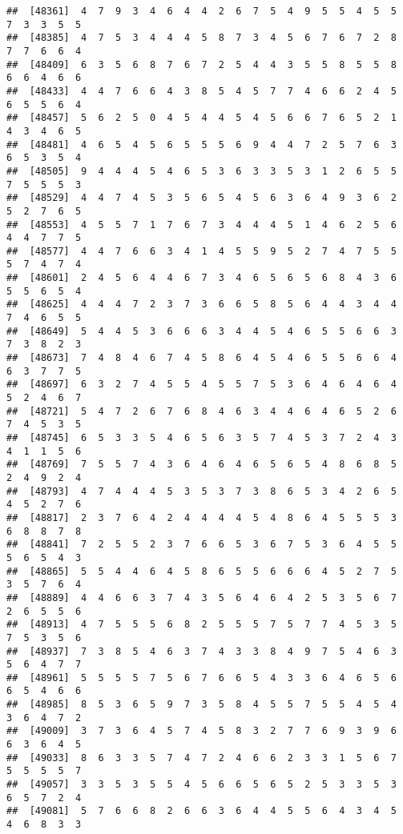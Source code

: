 \documentclass[
]{book}
\begin{document}
\begin{verbatim}
##  [48361]  4  7  9  3  4  6  4  4  2  6  7  5  4  9  5  5  4  5  5  7  3  3  5  5
##  [48385]  4  7  5  3  4  4  4  5  8  7  3  4  5  6  7  6  7  2  8  7  7  6  6  4
##  [48409]  6  3  5  6  8  7  6  7  2  5  4  4  3  5  5  8  5  5  8  6  6  4  6  6
##  [48433]  4  4  7  6  6  4  3  8  5  4  5  7  7  4  6  6  2  4  5  6  5  5  6  4
##  [48457]  5  6  2  5  0  4  5  4  4  5  4  5  6  6  7  6  5  2  1  4  3  4  6  5
##  [48481]  4  6  5  4  5  6  5  5  5  6  9  4  4  7  2  5  7  6  3  6  5  3  5  4
##  [48505]  9  4  4  4  5  4  6  5  3  6  3  3  5  3  1  2  6  5  5  7  5  5  5  3
##  [48529]  4  4  7  4  5  3  5  6  5  4  5  6  3  6  4  9  3  6  2  5  2  7  6  5
##  [48553]  4  5  5  7  1  7  6  7  3  4  4  4  5  1  4  6  2  5  6  4  4  7  7  5
##  [48577]  4  4  7  6  6  3  4  1  4  5  5  9  5  2  7  4  7  5  5  5  7  4  7  4
##  [48601]  2  4  5  6  4  4  6  7  3  4  6  5  6  5  6  8  4  3  6  5  5  6  5  4
##  [48625]  4  4  4  7  2  3  7  3  6  6  5  8  5  6  4  4  3  4  4  7  4  6  5  5
##  [48649]  5  4  4  5  3  6  6  6  3  4  4  5  4  6  5  5  6  6  3  7  3  8  2  3
##  [48673]  7  4  8  4  6  7  4  5  8  6  4  5  4  6  5  5  6  6  4  6  3  7  7  5
##  [48697]  6  3  2  7  4  5  5  4  5  5  7  5  3  6  4  6  4  6  4  5  2  4  6  7
##  [48721]  5  4  7  2  6  7  6  8  4  6  3  4  4  6  4  6  5  2  6  7  4  5  3  5
##  [48745]  6  5  3  3  5  4  6  5  6  3  5  7  4  5  3  7  2  4  3  4  1  1  5  6
##  [48769]  7  5  5  7  4  3  6  4  6  4  6  5  6  5  4  8  6  8  5  2  4  9  2  4
##  [48793]  4  7  4  4  4  5  3  5  3  7  3  8  6  5  3  4  2  6  5  4  5  2  7  6
##  [48817]  2  3  7  6  4  2  4  4  4  4  5  4  8  6  4  5  5  5  3  6  8  8  7  8
##  [48841]  7  2  5  5  2  3  7  6  6  5  3  6  7  5  3  6  4  5  5  5  6  5  4  3
##  [48865]  5  5  4  4  6  4  5  8  6  5  5  6  6  6  4  5  2  7  5  3  5  7  6  4
##  [48889]  4  4  6  6  3  7  4  3  5  6  4  6  4  2  5  3  5  6  7  2  6  5  5  6
##  [48913]  4  7  5  5  5  6  8  2  5  5  5  7  5  7  7  4  5  3  5  7  5  3  5  6
##  [48937]  7  3  8  5  4  6  3  7  4  3  3  8  4  9  7  5  4  6  3  5  6  4  7  7
##  [48961]  5  5  5  5  7  5  6  7  6  6  5  4  3  3  6  4  6  5  6  6  5  4  6  6
##  [48985]  8  5  3  6  5  9  7  3  5  8  4  5  5  7  5  5  4  5  4  3  6  4  7  2
##  [49009]  3  7  3  6  4  5  7  4  5  8  3  2  7  7  6  9  3  9  6  6  3  6  4  5
##  [49033]  8  6  3  3  5  7  4  7  2  4  6  6  2  3  3  1  5  6  7  5  5  5  5  7
##  [49057]  3  3  5  3  5  5  4  5  6  6  5  6  5  2  5  3  3  5  3  6  5  7  2  4
##  [49081]  5  7  6  6  8  2  6  6  3  6  4  4  5  5  6  4  3  4  5  4  6  8  3  3

\end{verbatim}
\end{document}
